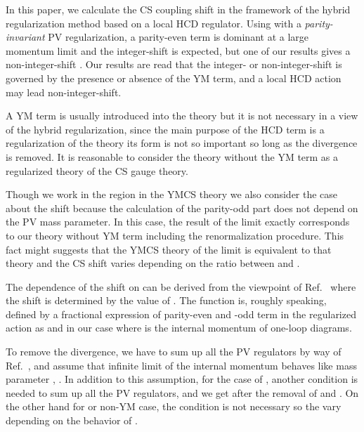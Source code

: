 \documentclass[a4paper,12pt]{article}
\begin{document}
In this paper, we calculate the CS coupling shift
in the framework of the hybrid regularization method
based on a local HCD regulator.
%
Using with a \textit{parity-invariant} PV regularization,
a parity-even term is dominant at a large momentum limit
and the integer-shift is expected,
but one of our results gives a non-integer-shift \coordHE{}.
%
Our results are read that
the integer- or non-integer-shift is governed by
the presence or absence of the YM term,
and a local HCD action may lead non-integer-shift.
%


%
A YM term is usually introduced into the theory but it is not necessary
in a view of the hybrid regularization,
since the main purpose of the HCD term is a regularization of the theory
its form is not so important
so long as the divergence is removed.
%
It is reasonable to consider the theory without the YM term
as a regularized theory of the CS gauge theory.

%
Though we work in the region \myHighlight{$\mu\ll\Lambda$}\coordHE{} in the YMCS theory
we also consider the case \myHighlight{$\mu\gg\Lambda$}\coordHE{} about the shift
because the calculation of the parity-odd part does not depend on
the PV mass parameter.
%
In this case,
the result of the limit \myHighlight{$\mu / \Lambda = \infty$}\coordHE{}
exactly corresponds to our theory without YM term
including the renormalization procedure.
%
This fact might suggests that
the YMCS theory of the limit \myHighlight{$\mu / \Lambda = \infty$}\coordHE{}
is equivalent to that theory
and the CS shift varies depending on the ratio between \myHighlight{$\mu$}\coordHE{} and \myHighlight{$\Lambda$}\coordHE{}.

%
The dependence of the shift on \myHighlight{$\mu / \Lambda$}\coordHE{}
can be derived from the viewpoint of Ref.~\cite{Asorey:1994em}
where the shift is determined by the value of \myHighlight{$\phi (\infty)$}\coordHE{}.
%
The function \coordHE{} is, roughly speaking,
defined by a fractional expression of parity-even and -odd term
in the regularized action as
\coordHE{}
and in our case \coordHE{}
where \coordHE{} is the internal momentum of one-loop diagrams.

To remove the divergence,
we have to sum up all the PV regulators by way of Ref.~\cite{Nittoh:2000it,Nittoh:2001full},
and assume that
infinite limit of the internal momentum behaves like mass parameter \coordHE{},
\coordHE{}.
%
In addition to this assumption, for the case of \myHighlight{$\mu \ll \Lambda$}\coordHE{},
another condition \coordHE{} is needed to sum up all the PV regulators,
and we get \myHighlight{$\phi (\infty) = +\infty$}\coordHE{}
after the removal of \myHighlight{$\mu$}\coordHE{} and \myHighlight{$\Lambda$}\coordHE{}.
%
On the other hand for \myHighlight{$\mu \gg \Lambda$}\coordHE{} or non-YM case,
the condition \coordHE{} is not necessary
so the \myHighlight{$\phi (\infty)$}\coordHE{} vary depending on the behavior of \coordHE{}.
\end{document}
